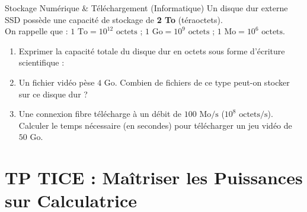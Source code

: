 \begin{exercice}[4 pts]{\capAnalyser}{Stockage Numérique \& Téléchargement (Informatique)}
Un disque dur externe SSD possède une capacité de stockage de \textbf{2 To} (téraoctets).\\
On rappelle que : $1\text{ To} = 10^{12}\text{ octets}$ \quad ; \quad $1\text{ Go} = 10^9\text{ octets}$ \quad ; \quad $1\text{ Mo} = 10^6\text{ octets}$.

\begin{enumerate}
    \item Exprimer la capacité totale du disque dur en octets sous forme d'écriture scientifique : \pointille[4cm]
    \item Un fichier vidéo pèse $4\text{ Go}$. Combien de fichiers de ce type peut-on stocker sur ce disque dur ?
    \item Une connexion fibre télécharge à un débit de $100\text{ Mo/s}$ ($10^8\text{ octets/s}$).\\
    Calculer le temps nécessaire (en secondes) pour télécharger un jeu vidéo de $50\text{ Go}$.
\end{enumerate}
\lignesreponse[5]
\end{exercice}

\section{TP TICE : Maîtriser les Puissances sur Calculatrice}

